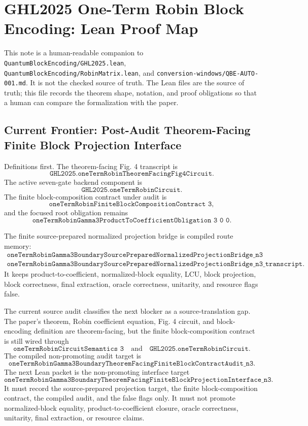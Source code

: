 \section{GHL2025 One-Term Robin Block Encoding: Lean Proof Map}

This note is a human-readable companion to
\texttt{QuantumBlockEncoding/GHL2025.lean},
\texttt{QuantumBlockEncoding/RobinMatrix.lean}, and
\texttt{conversion-windows/QBE-AUTO-001.md}.  It is not the checked source of
truth.  The Lean files are the source of truth; this file records the theorem
shape, notation, and proof obligations so that a human can compare the
formalization with the paper.

\subsection{Current Frontier: Post-Audit Theorem-Facing Finite Block Projection Interface}

Definitions first.  The theorem-facing Fig. 4 transcript is
\[
  \texttt{GHL2025.oneTermRobinTheoremFacingFig4Circuit}.
\]
The active seven-gate backend component is
\[
  \texttt{GHL2025.oneTermRobinCircuit}.
\]
The finite block-composition contract under audit is
\[
  \texttt{oneTermRobinFiniteBlockCompositionContract\ 3},
\]
and the focused root obligation remains
\[
  \texttt{oneTermRobinGamma3ProductToCoefficientObligation\ 3\ 0\ 0}.
\]

The finite source-prepared normalized projection bridge is compiled route
memory:
\[
\begin{array}{l}
\texttt{oneTermRobinGamma3BoundarySourcePreparedNormalizedProjectionBridge\_n3}\\
\texttt{oneTermRobinGamma3BoundarySourcePreparedNormalizedProjectionBridge\_n3\_transcript}.
\end{array}
\]
It keeps product-to-coefficient, normalized-block equality, LCU, block
projection, block correctness, final extraction, oracle correctness, unitarity,
and resource flags false.

The current source audit classifies the next blocker as a source-translation
gap.  The paper's theorem, Robin coefficient equation, Fig. 4 circuit, and
block-encoding definition are theorem-facing, but the finite block-composition
contract is still wired through
\[
  \texttt{oneTermRobinCircuitSemantics\ 3}
  \quad\text{and}\quad
  \texttt{GHL2025.oneTermRobinCircuit}.
\]
The compiled non-promoting audit target is
\[
  \texttt{oneTermRobinGamma3BoundaryTheoremFacingFiniteBlockContractAudit\_n3}.
\]
The next Lean packet is the non-promoting interface target
\[
  \texttt{oneTermRobinGamma3BoundaryTheoremFacingFiniteBlockProjectionInterface\_n3}.
\]
It must record the source-prepared projection target, the finite
block-composition contract, the compiled audit, and the false flags only.  It
must not promote normalized-block equality, product-to-coefficient closure,
oracle correctness, unitarity, final extraction, or resource claims.


